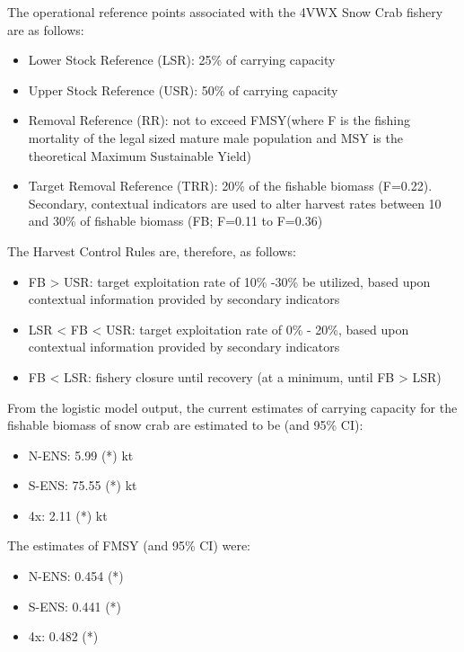 \documentclass[paper=a4, fontsize=11pt]{article}
\begin{document}
The operational reference points associated with the 4VWX Snow Crab fishery are as follows: 
\begin{itemize}
  \item Lower Stock Reference (LSR): 25\% of carrying capacity\
  \item Upper Stock Reference (USR): 50\% of carrying capacity\
  \item Removal Reference (RR): not to exceed FMSY(where F is the fishing mortality of the legal sized mature male population and MSY is the theoretical Maximum Sustainable Yield)\
  \item Target Removal Reference (TRR): 20\% of the fishable biomass (F=0.22). Secondary, contextual indicators are used to alter harvest rates between 10 and 30\% of fishable biomass (FB; F=0.11 to F=0.36)
\end{itemize}

The Harvest Control Rules are, therefore, as follows:\
\begin{itemize}
  \item FB > USR: target exploitation rate of 10\% -30\% be utilized, based upon contextual information provided by secondary indicators\
  \item LSR < FB < USR: target exploitation rate of 0\% - 20\%, based upon contextual information provided by secondary indicators\
  \item FB < LSR: fishery closure until recovery (at a minimum, until FB > LSR)\\
\end{itemize}
\clearpage

From the logistic model output, the current estimates of carrying capacity for the fishable biomass of snow crab are estimated to be (and 95\% CI):\
\begin{itemize}
  \item N-ENS: 5.99 (*) kt\
  \item S-ENS: 75.55 (*) kt\
  \item 4x: 2.11 (*) kt\\
\end{itemize}

The estimates of FMSY (and 95\% CI) were:\
\begin{itemize}
  \item N-ENS: 0.454 (*)\
  \item S-ENS: 0.441 (*)\
  \item 4x: 0.482 (*)\\
\end{itemize}
\end{document}
